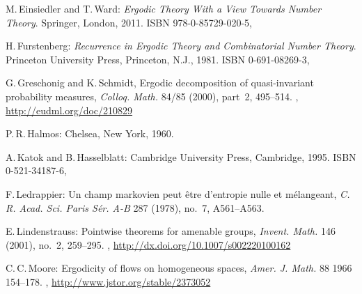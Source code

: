 \begin{references}{99}


M.\,Einsiedler and T.\,Ward:
\emph{Ergodic Theory With a View Towards Number Theory}.
Springer, London, 2011. 
ISBN 978-0-85729-020-5,

H.\,Furstenberg:
\emph{Recurrence in Ergodic Theory and Combinatorial Number Theory}. 
Princeton University Press, Princeton, N.J., 1981.
ISBN 0-691-08269-3,

  G.\,Greschonig and K.\,Schmidt,
  Ergodic decomposition of quasi-invariant probability measures,
  \emph{Colloq. Math.} 84/85 (2000), part~2, 495--514.
  ,
  \maynewline
  \url{http://eudml.org/doc/210829}

 P.\,R.\,Halmos:
 Chelsea, New York, 1960.

 A.\,Katok and B.\,Hasselblatt:
 Cambridge University Press, Cambridge, 1995.
 ISBN 0-521-34187-6,

F.\,Ledrappier:
Un champ markovien peut être d'entropie nulle et mélangeant,
\emph{C. R. Acad. Sci. Paris Sér. A-B} 287 (1978), no.~7, A561--A563. 

E.\,Lindenstrauss:
Pointwise theorems for amenable groups,
\emph{Invent. Math.} 146 (2001), no.~2, 259--295. 
,
\maynewline
\url{http://dx.doi.org/10.1007/s002220100162}


C.\,C.\,Moore:
Ergodicity of flows on homogeneous spaces,
\emph{Amer. J. Math.} 88 1966 154--178.
,
\maynewline
\url{http://www.jstor.org/stable/2373052}


\end{references}
